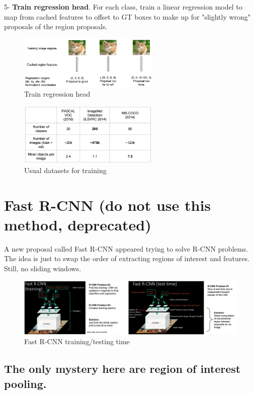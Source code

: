 5- \textbf{Train regression head}. For each class, train a linear regression model to map from cached features to offset to GT boxes to make up for "slightly wrong" proposals of the region proposals.
\begin{figure}[h]
  \centering
  \includegraphics[width=0.6\textwidth]{Images/region_based_cnn/5.png}
  \caption{Train regression head}
\end{figure}
\begin{figure}[h]
  \centering
  \includegraphics[width=0.6\textwidth]{Images/region_based_cnn/6.png}
  \caption{Usual datasets for training}
\end{figure}



\section{Fast R-CNN (do not use this method, deprecated)}
A new proposal called Fast R-CNN appeared trying to solve R-CNN problems. The idea is just to swap the order of extracting regions of interest and features. Still, no sliding windows.

\begin{figure}[h]
  \centering
  \includegraphics[width=\textwidth]{Images/region_based_cnn/10.png}
  \caption{Fast R-CNN training/testing time}
\end{figure}

\subsection*{The only mystery here are region of interest pooling.}

